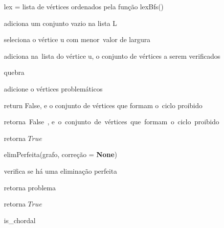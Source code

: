 \documentclass[a4paper, 11pt]{article}
\begin{document}
						\begin{algorithm}[H]
							
							lex = lista de vértices ordenados pela função lexBfs()
							
							{
								adiciona um conjunto vazio na lista L
							}
						
							{
								{
									seleciona o vértice u com menor\ valor de largura
									
									adiciona na\ lista do vértice u, o conjunto de vértices a serem verificados
								}
							
								\Else
								{
									quebra
								}
							}
						
							{
								{
									adicione o vértices problemáticos
									
									{
										return False, e o conjunto de vértices que formam o\ ciclo proibido
									}
								
									\Else
									{
										retorna\ False\ , e\ o\ conjunto\ de\ vértices\ que\ formam\ o\ ciclo\ proibido
									}
								}
							}
						
							retorna $True$
						
							\caption{elimPerfeita(grafo, correção = \textbf{None})}
						\end{algorithm}
					
						\begin{algorithm}[H]
							
							
							{
								verifica se há uma eliminação perfeita
								
								{
									retorna problema
								}
							}
						
							retorna $True$
			
							\caption{is\_chordal}
							
						\end{algorithm}
					
\end{document}
